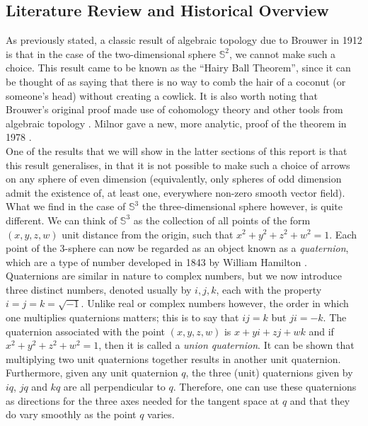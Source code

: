 \documentclass[12pt,a4paper]{article}
\begin{document}
\subsection{Literature Review and Historical Overview}
As previously stated, a classic result of algebraic topology due to Brouwer in 1912 \cite{MR1511678} is that in the case of the two-dimensional sphere $\mathbb{S}^2$, we cannot make such a choice. This result came to be known as the ``Hairy Ball Theorem'', since it can be thought of as saying that there is no way to comb the hair of a coconut (or someone's head) without creating a cowlick. It is also worth noting that Brouwer's original proof made use of cohomology theory and other tools from algebraic topology \cite{MR1415833}. Milnor gave a new, more analytic, proof of the theorem in 1978 \cite{MR505523}.\\

One of the results that we will show in the latter sections of this report is that this result generalises, in that it is not possible to make such a choice of arrows on any sphere of even dimension (equivalently, only spheres of odd dimension admit the existence of, at least one, everywhere non-zero smooth vector field). 
What we find in the case of $\mathbb{S}^3$ the three-dimensional sphere however, is quite different. We can think of $\mathbb{S}^3$ as the collection of all points of the form $(x,y,z,w)$ unit distance from the origin, such that $x^2+y^2+z^2+w^2=1$. Each point of the 3-sphere can now be regarded as an object known as a \textit{quaternion}, which are a type of number developed in 1843 by William Hamilton \cite{hamilton1844ii}.\\

Quaternions are similar in nature to complex numbers, but we now introduce three distinct numbers, denoted usually by $i,j,k$, each with the property $i=j=k=\sqrt{-1}$. Unlike real or complex numbers however, the order in which one multiplies quaternions matters; this is to say that $ij=k$ but $ji=-k$. The quaternion associated with the point $(x,y,z,w)$ is $x+yi+zj+wk$ and if $x^2+y^2+z^2+w^2=1$, then it is called a \textit{union quaternion}.
It can be shown that multiplying two unit quaternions together results in another unit quaternion. Furthermore, given any unit quaternion $q$, the three (unit) quaternions given by $iq$, $jq$ and $kq$ are all perpendicular to $q$. Therefore, one can use these quaternions as directions for the three axes needed for the tangent space at $q$ and that they do vary smoothly as the point $q$ varies.\\
\end{document}
